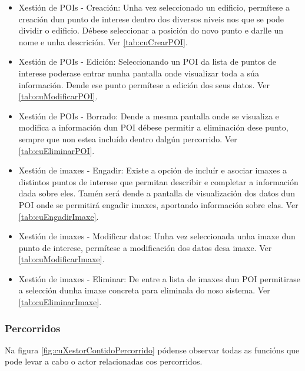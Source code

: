 \begin{itemize}
	\item Xestión de POIs - Creación: Unha vez seleccionado un edificio, permítese a creación dun punto de interese dentro dos diversos niveis nos que se pode dividir o edificio. Débese seleccionar a posición do novo punto e darlle un nome e unha descrición. Ver \ref{tab:cuCrearPOI}.
	\item Xestión de POIs - Edición: Seleccionando un POI da lista de puntos de interese poderase entrar nunha pantalla onde visualizar toda a súa información. Dende ese punto permítese a edición dos seus datos. Ver \ref{tab:cuModificarPOI}.
	\item Xestión de POIs - Borrado: Dende a mesma pantalla onde se visualiza e modifica a información dun POI débese permitir a eliminación dese punto, sempre que non estea incluído dentro dalgún percorrido. Ver \ref{tab:cuEliminarPOI}.
	\item Xestión de imaxes - Engadir: Existe a opción de incluír e asociar imaxes a distintos puntos de interese que permitan describir e completar a información dada sobre eles. Tamén será dende a pantalla de visualización dos datos dun POI onde se permitirá engadir imaxes, aportando información sobre elas. Ver \ref{tab:cuEngadirImaxe}.
	\item Xestión de imaxes - Modificar datos: Unha vez seleccionada unha imaxe dun punto de interese, permítese a modificación dos datos desa imaxe. Ver \ref{tab:cuModificarImaxe}.
	\item Xestión de imaxes - Eliminar: De entre a lista de imaxes dun POI permitirase a selección dunha imaxe concreta para eliminala do noso sistema. Ver \ref{tab:cuEliminarImaxe}.
\end{itemize}

\subsubsection{Percorridos}
Na figura \ref{fig:cuXestorContidoPercorrido} pódense observar todas as funcións que pode levar a cabo o actor relacionadas cos percorridos.

